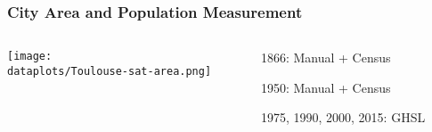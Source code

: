 \documentclass[aspectratio=169]{beamer}
\begin{document}




\begin{frame}
\frametitle{City Area and Population Measurement}
\begin{columns}

\begin{column}{0.7\textwidth}
	\begin{adjustbox}{center}
	\texttt{[image: \\dataplots/Toulouse-sat-area.png]}\end{adjustbox}
	\end{column}
\begin{column}{0.3\textwidth}
\begin{midi}
\item 1866: Manual + Census
\item 1950: Manual + Census
\item 1975, 1990, 2000, 2015: GHSL
\end{midi}
	
\end{column}
\end{columns}
\end{frame}
\end{document}
